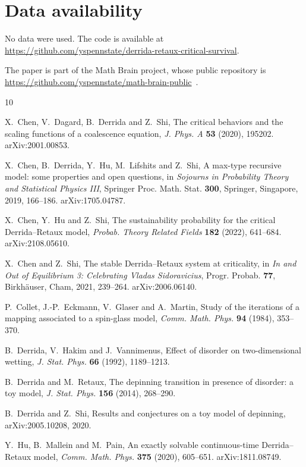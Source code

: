 \documentclass[11pt]{amsart}
\theoremstyle{definition}
\theoremstyle{remark}
\numberwithin{equation}{section}
\begin{document}
\section*{Data availability}
No data were used. The code is available at\\ \url{https://github.com/yspennstate/derrida-retaux-critical-survival}.

The paper is part of the Math Brain project, whose public repository is \url{https://github.com/yspennstate/math-brain-public}~\cite{MathBrainRepo}.

\begin{thebibliography}{10}

X.~Chen, V.~Dagard, B.~Derrida and Z.~Shi, The critical behaviors and the scaling functions of a coalescence equation, \emph{J. Phys. A} \textbf{53} (2020), 195202. arXiv:2001.00853.

X.~Chen, B.~Derrida, Y.~Hu, M.~Lifshits and Z.~Shi, A max-type recursive model: some properties and open questions, in \emph{Sojourns in Probability Theory and Statistical Physics III}, Springer Proc. Math. Stat. \textbf{300}, Springer, Singapore, 2019, 166--186. arXiv:1705.04787.

X.~Chen, Y.~Hu and Z.~Shi, The sustainability probability for the critical Derrida--Retaux model, \emph{Probab. Theory Related Fields} \textbf{182} (2022), 641--684. arXiv:2108.05610.

X.~Chen and Z.~Shi, The stable Derrida--Retaux system at criticality, in \emph{In and Out of Equilibrium 3: Celebrating Vladas Sidoravicius}, Progr. Probab. \textbf{77}, Birkh\"auser, Cham, 2021, 239--264. arXiv:2006.06140.

P.~Collet, J.-P.~Eckmann, V.~Glaser and A.~Martin, Study of the iterations of a mapping associated to a spin-glass model, \emph{Comm. Math. Phys.} \textbf{94} (1984), 353--370.

B.~Derrida, V.~Hakim and J.~Vannimenus, Effect of disorder on two-dimensional wetting, \emph{J. Stat. Phys.} \textbf{66} (1992), 1189--1213.

B.~Derrida and M.~Retaux, The depinning transition in presence of disorder: a toy model, \emph{J. Stat. Phys.} \textbf{156} (2014), 268--290.

B.~Derrida and Z.~Shi, Results and conjectures on a toy model of depinning, arXiv:2005.10208, 2020.

Y.~Hu, B.~Mallein and M.~Pain, An exactly solvable continuous-time Derrida--Retaux model, \emph{Comm. Math. Phys.} \textbf{375} (2020), 605--651. arXiv:1811.08749.


\end{thebibliography}
\end{document}
